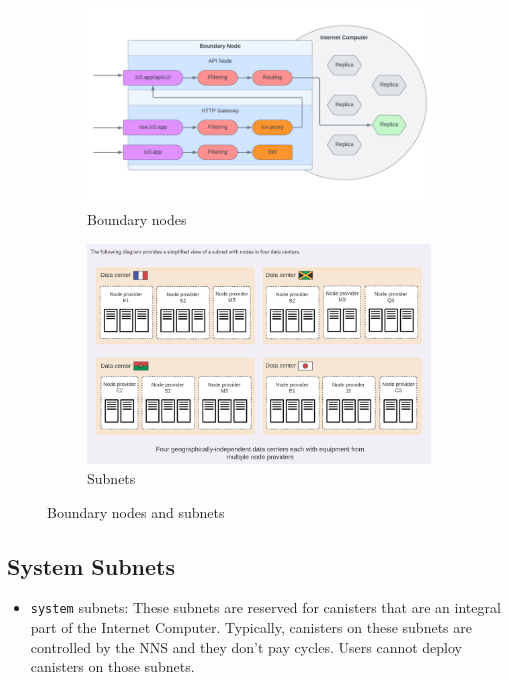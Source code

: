\begin{figure}
	\begin{subfigure}[t]{.5\linewidth}
		\centering
		\includegraphics[width=.8\linewidth]{figures/boundary-nodes.png}
		\caption{Boundary nodes}
		\label{sfig:boundarynodes}
	\end{subfigure}
	\begin{subfigure}[t]{.5\linewidth}
		\centering
		\includegraphics[width=.8\linewidth]{figures/subnet.png}
		\caption{Subnets}
		\label{sfig:subnet}
	\end{subfigure}
	\caption{Boundary nodes and subnets}
	\label{fig:icboundarysubnet}
\end{figure}

\subsection{System Subnets}

\begin{itemize}
  \item \texttt{system} subnets: These subnets are reserved for canisters that are an integral part of the Internet Computer. Typically, canisters on these subnets are controlled by the NNS and they don't pay cycles. Users cannot deploy canisters on those subnets.
\end{itemize}

